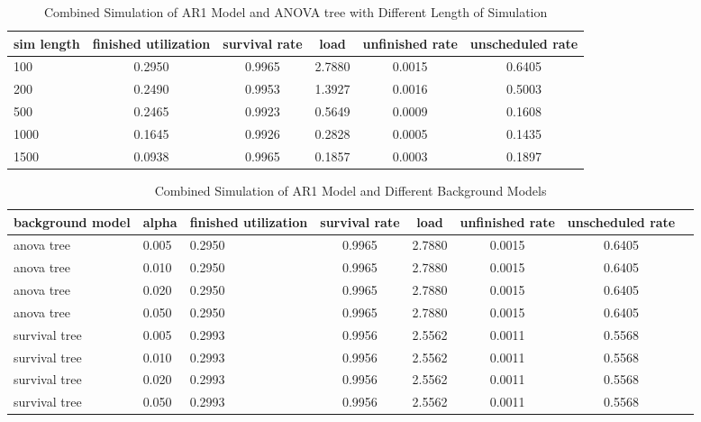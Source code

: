 \documentclass{article}
\begin{document}
\begin{longtable}[htbp]{l|*{5}{c}} 
  \caption{Combined Simulation of AR1 Model and ANOVA tree with Different Length of Simulation}
  \label{tab:tab3.2.2} \\
  \textbf{sim length} & \textbf{finished utilization} & \textbf{survival rate} &
  \textbf{load} & \textbf{unfinished rate} & \textbf{unscheduled rate} \\
  \hline
  100 & 0.2950 & 0.9965 & 2.7880 & 0.0015 & 0.6405\\
  200 & 0.2490 & 0.9953 & 1.3927 & 0.0016 & 0.5003\\
  500 & 0.2465 & 0.9923 & 0.5649 & 0.0009 & 0.1608\\
  1000 & 0.1645 & 0.9926 & 0.2828 & 0.0005 & 0.1435\\
  1500 & 0.0938 & 0.9965 & 0.1857 & 0.0003 & 0.1897\\
\end{longtable}

\begin{longtable}[htbp]{l|l|l|*{5}{c}} 
  \caption{Combined Simulation of AR1 Model and Different Background Models}
  \label{tab:tab3.2.3}\\
  \textbf{background model} & \textbf{alpha} & \textbf{finished
  utilization} & \textbf{survival rate} & \textbf{load} & \textbf{unfinished
  rate} & \textbf{unscheduled rate} \\
  \hline
  anova tree & 0.005 & 0.2950 & 0.9965 & 2.7880 & 0.0015 & 0.6405\\
  anova tree & 0.010 & 0.2950 & 0.9965 & 2.7880 & 0.0015 & 0.6405\\
  anova tree & 0.020 & 0.2950 & 0.9965 & 2.7880 & 0.0015 & 0.6405\\
  anova tree & 0.050 & 0.2950 & 0.9965 & 2.7880 & 0.0015 & 0.6405\\
  survival tree & 0.005 & 0.2993 & 0.9956 & 2.5562 & 0.0011 & 0.5568\\
  survival tree & 0.010 & 0.2993 & 0.9956 & 2.5562 & 0.0011 & 0.5568\\
  survival tree & 0.020 & 0.2993 & 0.9956 & 2.5562 & 0.0011 & 0.5568\\
  survival tree & 0.050 & 0.2993 & 0.9956 & 2.5562 & 0.0011 & 0.5568\\
\end{longtable}
\end{document}
